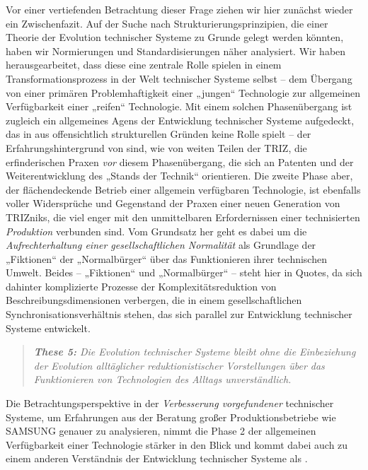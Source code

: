 \documentclass[12pt,a4paper]{article}
\begin{document}
Vor einer vertiefenden Betrachtung dieser Frage ziehen wir hier zunächst
wieder ein Zwischenfazit.  Auf der Suche nach Strukturierungsprinzipien, die
einer Theorie der Evolution technischer Systeme zu Grunde gelegt werden
könnten, haben wir Normierungen und Standardisierungen näher analysiert. Wir
haben herausgearbeitet, dass diese eine zentrale Rolle spielen in einem
Transformationsprozess in der Welt technischer Systeme selbst -- dem Übergang
von einer primären Problemhaftigkeit einer „jungen“ Technologie zur
allgemeinen Verfügbarkeit einer „reifen“ Technologie.  Mit einem solchen
Phasenübergang ist zugleich ein allgemeines Agens der Entwicklung technischer
Systeme aufgedeckt, das in \cite{TESE2018} aus offensichtlich strukturellen
Gründen keine Rolle spielt -- der Erfahrungshintergrund von \cite{TESE2018}
sind, wie von weiten Teilen der TRIZ, die erfinderischen Praxen \emph{vor}
diesem Phasenübergang, die sich an Patenten und der Weiterentwicklung des
„Stands der Technik“ orientieren.  Die zweite Phase aber, der flächendeckende
Betrieb einer allgemein verfügbaren Technologie, ist ebenfalls voller
Widersprüche und Gegenstand der Praxen einer neuen Generation von TRIZniks,
die viel enger mit den unmittelbaren Erfordernissen einer technisierten
\emph{Produktion} verbunden sind.  Vom Grundsatz her geht es dabei um die
\emph{Aufrechterhaltung einer gesellschaftlichen Normalität} als Grundlage der
„Fiktionen“ der „Normalbürger“ über das Funktionieren ihrer technischen
Umwelt.  Beides -- „Fiktionen“ und „Normalbürger“ -- steht hier in Quotes, da
sich dahinter komplizierte Prozesse der Komplexitätsreduktion von
Beschreibungsdimensionen verbergen, die in einem gesellschaftlichen
Synchronisationsverhältnis stehen, das sich parallel zur Entwicklung
technischer Systeme entwickelt.
\begin{quote}\it
  \textbf{These 5:} Die Evolution technischer Systeme bleibt ohne die
  Einbeziehung der Evolution alltäglicher reduktionistischer Vorstellungen
  über das Funktionieren von Technologien des Alltags unverständlich.   
\end{quote}

Die Betrachtungsperspektive in \cite{Shpakovsky2010} der \emph{Verbesserung
  vorgefundener} technischer Systeme, um Erfahrungen aus der Beratung großer
Produktionsbetriebe wie SAMSUNG genauer zu analysieren, nimmt die Phase 2 der
allgemeinen Verfügbarkeit einer Technologie stärker in den Blick und kommt
dabei auch zu einem anderen Verständnis der Entwicklung technischer Systeme
als \cite{TESE2018}.
\end{document}
